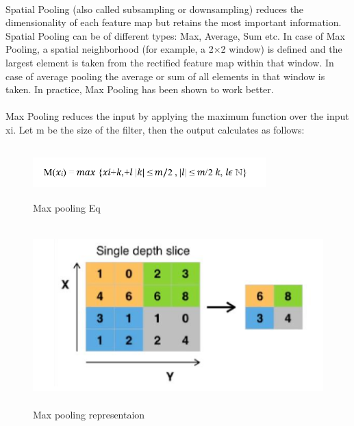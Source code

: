 \documentclass[a4paper,12pt,oneside]{article}
\begin{document}
\paragraph{}
﻿Spatial Pooling (also called subsampling or downsampling) reduces the dimensionality of each
feature map but retains the most important information. Spatial Pooling can be of different
types: Max, Average, Sum etc. In case of Max Pooling, a spatial neighborhood (for example, a
2×2 window) is defined and the largest element is taken from the rectified feature map within
that window. In case of average pooling the average or sum of all elements in that window is
taken. In practice, Max Pooling has been shown to work better.
\paragraph{}
﻿Max Pooling reduces the input by applying the maximum function over the input xi. Let m be
the size of the filter, then the output calculates as follows:
\vspace{0.5cm}

\begin{figure}[H]
\centering
\includegraphics[height=2cm,width=09cm]{1b.png}
\caption{Max pooling Eq}
\end{figure}

\begin{figure}[H]
\centering
\includegraphics[height=07cm,width=14cm]{2.png}
\caption{Max pooling representaion}
\end{figure}
\end{document}
